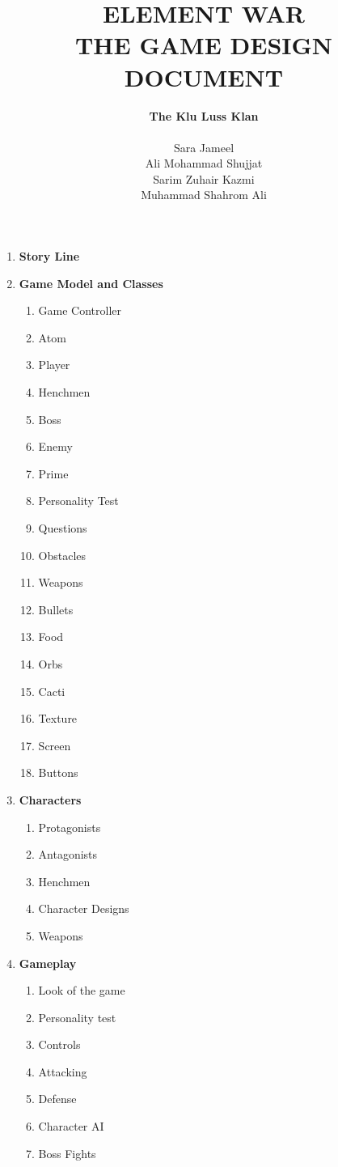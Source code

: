\documentclass[a4paper, 11pt]{report}
\title{ELEMENT WAR \\ THE GAME DESIGN DOCUMENT}
\author{ \textbf{The Klu Luss Klan} \\ \\ Sara Jameel \\ Ali Mohammad Shujjat \\ Sarim Zuhair Kazmi \\ Muhammad Shahrom Ali}
\begin{document}
	\setlength{\parskip}{10pt} %
	\setlength{\parindent}{0pt}
	\maketitle

	\begin{enumerate}

		\item \textbf{Story Line}
		\item \textbf{Game Model and Classes}
			\begin{enumerate}
				\item Game Controller 
				\item Atom
				\item Player
				\item Henchmen 
				\item Boss
				\item Enemy
				\item Prime
				\item Personality Test
				\item Questions
				\item Obstacles
				\item Weapons 
				\item Bullets
				\item Food 
				\item Orbs
				\item Cacti
				\item Texture
				\item Screen
				\item Buttons
			\end{enumerate}
		\item \textbf{Characters}
			\begin{enumerate}
				\item Protagonists	
				\item Antagonists 
				\item Henchmen
				\item Character Designs
				\item Weapons
			\end{enumerate}
		\item \textbf{Gameplay}
			\begin{enumerate}
				\item Look of the game
				\item Personality test 
				\item Controls
				\item Attacking 
				\item Defense 
				\item Character AI
				\item Boss Fights
			\end{enumerate}

	\end{enumerate}
\end{document}
